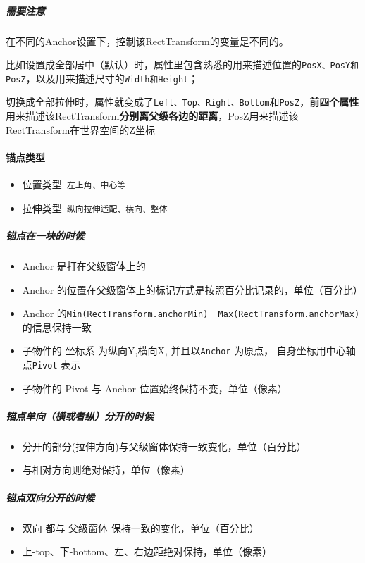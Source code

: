 \documentclass[UTF8,a4paper,12pt]{ctexbook}
\begin{document}
			
			\subparagraph{需要注意} 在不同的Anchor设置下，控制该RectTransform的变量是不同的。
			
			比如设置成全部居中（默认）时，属性里包含熟悉的用来描述位置的\verb|PosX、PosY和PosZ|，以及用来描述尺寸的\verb|Width和Height|；
			
			切换成全部拉伸时，属性就变成了\verb|Left、Top、Right、Bottom|和\verb|PosZ|，\textbf{前四个属性}用来描述该RectTransform\textbf{分别离父级各边的距离}，PosZ用来描述该RectTransform在世界空间的Z坐标
			
			\paragraph{锚点类型}
				\begin{itemize}
					\item 位置类型\verb| 左上角、中心等|
					\item 拉伸类型\verb| 纵向拉伸适配、横向、整体|
				\end{itemize}
		
				\subparagraph{锚点在一块的时候}
					\begin{itemize}[itemindent = 2em]
						\item Anchor 是打在父级窗体上的
						\item Anchor 的位置在父级窗体上的标记方式是按照百分比记录的，单位（百分比）
						\item Anchor 的\verb|Min(RectTransform.anchorMin)  Max(RectTransform.anchorMax)|的信息保持一致
						\item 子物件的 坐标系 为纵向Y,横向X, 并且以\verb|Anchor| 为原点， 自身坐标用中心轴点\verb|Pivot| 表示						
						\item 子物件的 Pivot 与 Anchor  位置始终保持不变，单位（像素）
					\end{itemize}
				
				\subparagraph{锚点单向（横或者纵）分开的时候}
					\begin{itemize}[itemindent = 2em]
						\item 分开的部分(拉伸方向)与父级窗体保持一致变化，单位（百分比）
						\item 与相对方向则绝对保持，单位（像素）
					\end{itemize}
				
				\subparagraph{锚点双向分开的时候}
					\begin{itemize}[itemindent = 2em]
						\item 双向 都与 父级窗体 保持一致的变化，单位（百分比）
						\item 上-top、下-bottom、左、右边距绝对保持，单位（像素）
					\end{itemize}
		
\end{document}
